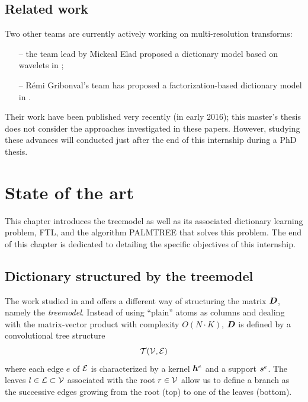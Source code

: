 \section{Related work}
Two other teams are currently actively working on multi-resolution transforms:
\begin{itemize}
	\item[--] the team lead by Mickeal Elad proposed a dictionary model based on wavelets in \cite{sulam_trainlets:_2016};
	\item[--] Rémi Gribonval’s team has proposed a factorization-based dictionary model in  \cite{le_magoarou_flexible_2016}.
\end{itemize}
Their work have been published very recently (in early 2016); this master's thesis does not consider the approaches investigated in these papers. However, studying these advances will conducted just after the end of this internship during a PhD thesis.


\chapter{State of the art}
This chapter introduces the \Gls{treemodel} as well as its associated dictionary learning problem, \acs{FTL}, and the algorithm \ac{PALMTREE} that solves this problem. The end of this chapter is dedicated to detailing the specific objectives of this internship.

\section{Dictionary structured by the \Gls{treemodel}}\label{sec_tree_model}
The work studied in \cite{chabiron_toward_2015} and \cite{chabiron_optimization_2016} offers a different way of structuring the matrix $\bm{D}$, namely the \emph{\Gls{treemodel}}. Instead of using “plain” atoms as columns and dealing with the matrix-vector product with complexity $O(N \cdot K)$, $\bm{D}$ is defined by a convolutional tree structure \begin{equation*}\mathcal T(\mathcal V,\mathcal E)\end{equation*} where each edge $e$ of $\mathcal E$ is characterized by a kernel $\bm{h}^e$ and a support $\bm{s}^e$. The leaves $l \in \mathcal L \subset \mathcal V$ associated with the root $r \in \mathcal V$ allow us to define a branch as the successive edges growing from the root (top) to one of the leaves (bottom).


